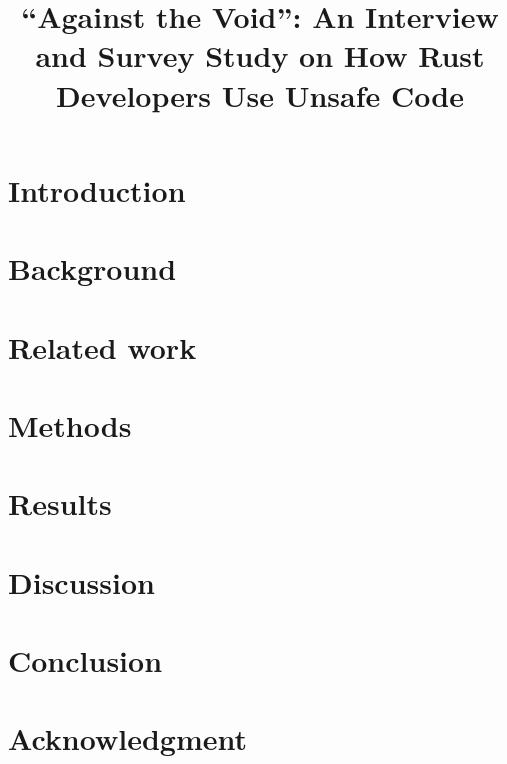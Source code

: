 \documentclass[10pt, conference]{IEEEtran}
\begin{document}
\title{``Against the Void'': An Interview and Survey Study on How Rust Developers Use Unsafe Code}
\newcommand{\linebreakand}{%
  \end{@IEEEauthorhalign}
  \hfill\mbox{}\par
  \mbox{}\hfill\begin{@IEEEauthorhalign}
}
\author{
}

\maketitle
\pagestyle{plain}
\begin{abstract}

\end{abstract}

\section{Introduction}


\section{Background}
\label{section:background}


\section{Related work}
\label{section:related}


\section{Methods}
\label{section:methods}


\section{Results}
\label{section:results}


\section{Discussion}
\label{section:discussion}


\section{Conclusion}
\label{section:conclusion}


\section*{Acknowledgment}
\label{section:acks}




\end{document}
